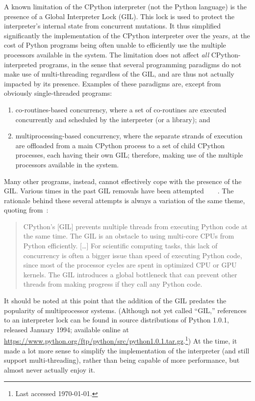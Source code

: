 A known limitation of the CPython interpreter (not the Python language) is the presence of a Global Interpreter Lock (GIL).
This lock is used to protect the interpreter's internal state from concurrent mutations.
It thus simplified significantly the implementation of the CPython interpreter over the years, at the cost of Python programs being often unable to efficiently use the multiple processors available in the system.
The limitation does not affect \emph{all} CPython-interpreted programs, in the sense that several programming paradigms do not make use of multi-threading regardless of the GIL, and are thus not actually impacted by its presence.
Examples of these paradigms are, except from obviously single-threaded programs:
\begin{enumerate}
    \item co-routines-based concurrency, where a set of co-routines are executed concurrently and scheduled by the interpreter (or a library); and
    \item multiprocessing-based concurrency, where the separate strands of execution are offloaded from a main CPython process to a set of child CPython processes, each having their own GIL; therefore, making use of the multiple processors available in the system.
\end{enumerate}

Many other programs, instead, cannot effectively cope with the presence of the GIL\@.
Various times in the past GIL removals have been attempted~\cite{dabeaz-gil}~\cite[\S Related Work, Gilectomy]{pep703}~\cite[\S Related Work, PyParallel]{pep703}~\cite[\S Related Work, python-safethread]{pep703}.
The rationale behind these several attempts is always a variation of the same theme, quoting from~\cite{pep703}:
\begin{quote}
    CPython's [GIL] prevents multiple threads from executing Python code at the same time.
    The GIL is an obstacle to using multi-core CPUs from Python efficiently.
    [\ldots] For scientific computing tasks, this lack of concurrency is often a bigger issue than speed of executing Python code, since most of the processor cycles are spent in optimized CPU or GPU kernels.
    The GIL introduces a global bottleneck that can prevent other threads from making progress if they call any Python code.
\end{quote}

It should be noted at this point that the addition of the GIL predates the popularity of multiprocessor systems.
(Although not yet called ``GIL,'' references to an interpreter lock can be found in source distributions of Python 1.0.1, released January 1994; available online at \url{https://www.python.org/ftp/python/src/python1.0.1.tar.gz}.\footnote{Last accessed \today.})
At the time, it made a lot more sense to simplify the implementation of the interpreter (and still support multi-threading), rather than being capable of more performance, but almost never actually enjoy it.

